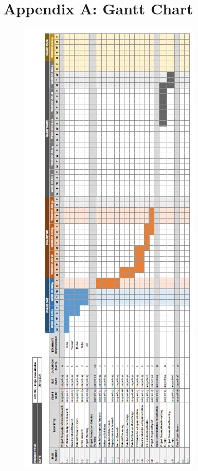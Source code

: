 \documentclass{article} %
\begin{document}
\section{Appendix A: Gantt Chart}
\begin{figure}[htbp]
  \centering
  \includegraphics[width=0.58\linewidth]{Figs/gant-chart-full.jpg}
  \label{fig:gantt_chart}
\end{figure}
\end{document}
